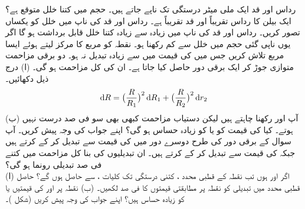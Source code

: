 رداس  اور قد  ایک ملی میٹر درستگی تک ناپے جاتے ہیں۔ حجم  میں کتنا خلل متوقع ہے؟ 
ایک بیلن کا رداس  تقریباً  اور قد تقریباً   ہے۔  رداس اور قد کی ناپ میں خلل کو یکساں تصور کریں۔ رداس اور قد کی ناپ میں زیادہ سے زیادہ کتنا خلل  قابل برداشت ہو گا اگر یوں ناپی گئی حجم میں خلل  سے کم رکھنا ہو۔ 
نقطہ  کو  مربع  کا مرکز لیتے ہوئے ایسا مربع تلاش کریں جس میں   کی قیمت میں   سے زیادہ تبدیل نہ ہو۔
دو برقی مزاحمت متوازی جوڑ کر ایک برقی دور حاصل کیا  جاتا  ہے۔ ان کی کل مزاحمت  ہو گی۔ (ا) درج ذیل دکھائیں۔
\begin{align*}
\dif R=\big(\frac{R}{R_1}\big)^2\dif R_1+\big(\frac{R}{R_2}\big)^2\dif r_2
\end{align*}
(ب) آپ   اور  رکھنا چاہتے ہیں لیکن   دستیاب مزاحمت کبھی بھی سو فی صد درست  نہیں ہوتے۔ کیا  کی قیمت  کو یا  کو زیادہ حساس ہو گی؟ اپنے جواب کی وجہ پیش کریں۔
آپ سوال  کے برقی دور کی طرح دوسرے دور  میں   کی قیمت   سے تبدیل کر کے  کرتے ہیں جبکہ  کی قیمت  سے تبدیل کر کے  کرتے ہیں۔ ان تبدیلیوں کی بنا کل مزاحمت  میں  کتنے فی صد تبدیلی رونما  ہو گی؟
\\
(ا) اگر  اور  ہوں تب  نقطہ  کے قطبی محدد ،  کتنی درستگی  تک   کلیات ،  سے   حاصل ہوں گے؟   حاصل قطبی محدد  میں تبدیلی کو  نقطہ  پر مطابقتی قیمتوں کا فی صد  لکھیں۔ (ب) نقطہ  پر  اور  کی قیمتیں  یا  کو زیادہ حساس ہیں؟ اپنے جواب کی وجہ پیش کریں (شکل )۔ 
